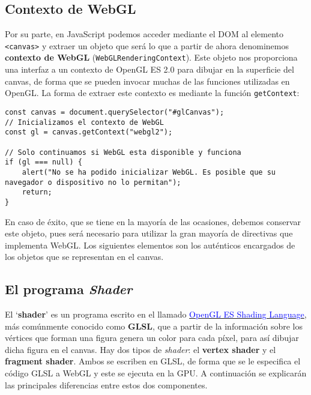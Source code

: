 \subsection{Contexto de WebGL}

Por su parte, en JavaScript podemos acceder mediante el DOM al elemento \verb|<canvas>| y extraer un objeto que será lo que a partir de ahora denominemos \textbf{contexto de WebGL} (\verb|WebGLRenderingContext|). Este objeto nos proporciona una interfaz a un contexto de OpenGL ES 2.0 para dibujar en la superficie del canvas, de forma que se pueden invocar muchas de las funciones utilizadas en OpenGL. La forma de extraer este contexto es mediante la función \verb|getContext|:

\begin{lstlisting}
const canvas = document.querySelector("#glCanvas");
// Inicializamos el contexto de WebGL
const gl = canvas.getContext("webgl2");

// Solo continuamos si WebGL esta disponible y funciona
if (gl === null) {
    alert("No se ha podido inicializar WebGL. Es posible que su navegador o dispositivo no lo permitan");
    return;
}
\end{lstlisting}

En caso de éxito, que se tiene en la mayoría de las ocasiones, debemos conservar este objeto, pues será necesario para utilizar la gran mayoría de directivas que implementa WebGL. Los siguientes elementos son los auténticos encargados de los objetos que se representan en el canvas.

\subsection{El programa \textit{Shader}}

El `\textbf{shader}' es un programa escrito en el llamado \href{https://www.khronos.org/registry/OpenGL/specs/es/3.2/GLSL_ES_Specification_3.20.pdf}{\textcolor{blue}{OpenGL ES Shading Language}}, más comúnmente conocido como \textbf{GLSL}, que a partir de la información sobre los vértices que forman una figura genera un color para cada píxel, para así dibujar dicha figura en el canvas. Hay dos tipos de \textit{shader}: el \textbf{vertex shader} y el \textbf{fragment shader}. Ambos se escriben en GLSL, de forma que se le especifica el código GLSL a WebGL y este se ejecuta en la GPU. A continuación se explicarán las principales diferencias entre estos dos componentes.

